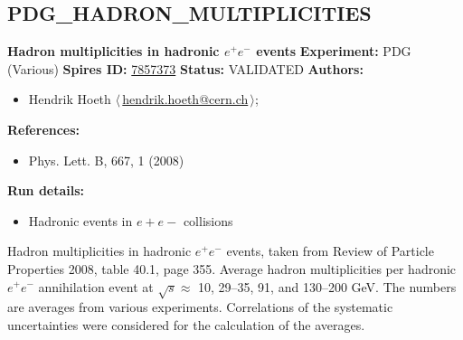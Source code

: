 \subsection[PDG\_HADRON\_MULTIPLICITIES]{PDG\_HADRON\_MULTIPLICITIES\,\cite{Amsler:2008zzb}}
\textbf{Hadron multiplicities in hadronic $e^+e^-$ events}\newline
\textbf{Experiment:} PDG (Various) \newline
\textbf{Spires ID:} \href{http://www.slac.stanford.edu/spires/find/hep/www?rawcmd=key+7857373}{7857373}\newline
\textbf{Status:} VALIDATED\newline
\textbf{Authors:}
\begin{itemize}
  \item Hendrik Hoeth $\langle\,$\href{mailto:hendrik.hoeth@cern.ch}{hendrik.hoeth@cern.ch}$\,\rangle$;
\end{itemize}
\textbf{References:}
\begin{itemize}
  \item Phys. Lett. B, 667, 1 (2008)
\end{itemize}
\textbf{Run details:}
\begin{itemize}

  \item Hadronic events in $e+e-$ collisions\end{itemize}

\noindent Hadron multiplicities in hadronic $e^+e^-$ events, taken from Review of Particle Properties 2008, table 40.1, page 355.   Average hadron multiplicities per hadronic $e^+e^-$ annihilation event at $\sqrt{s} \approx {}$ 10, 29--35, 91, and 130--200 GeV. The numbers are averages from various experiments. Correlations of the systematic uncertainties were considered for the calculation of the averages.

\clearpage


\clearpage

